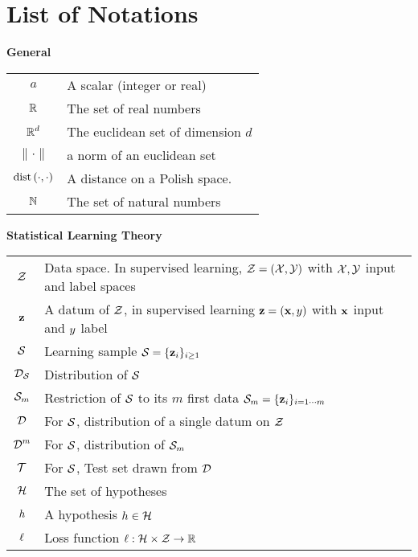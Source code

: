 \chapter*{List of Notations}
\mtcaddchapter

\def\arraystretch{1.5}

\centerline{\bf General}
\vspace{0.2cm}
\begin{tabular}{cp{13cm}}
$\displaystyle a$ & A scalar (integer or real)\\
$\displaystyle \R$ & The set of real numbers\\
$\displaystyle \R^d$ & The euclidean set of dimension $d$\\
$\|\cdot\|$ & a norm of an euclidean set \\
$\dist\LP\cdot,\cdot\RP$ & A distance on a Polish space. \\ 
$\displaystyle \N$ & The set of natural numbers\
\end{tabular}


\vspace{0.7cm}
\centerline{\bf Statistical Learning Theory}
\vspace{0.2cm}
\begin{tabular}{cp{13cm}}
$\displaystyle \Z$ & Data space. In supervised learning, $\Z=(\X,\Y)$ with $\X,\Y$ input and label spaces \\
$\displaystyle \z$ & A datum of $\Z$, in supervised learning $\z=(\x,\y)$ with $\x$ input and $\y$ label  \\
$\displaystyle \S$ & Learning sample $\S=\{\z_i\}_{i\geq 1}$\\
$\displaystyle \DS$ & Distribution of $\S$\\
$\displaystyle \Sm$ & Restriction of $\S$ to its $m$ first data $\S_m=\{\z_i\}_{i= 1\cdots m}$\\
$\displaystyle \D$ & For \iid $\S$, distribution of a single datum on $\Z$\\
$\displaystyle \D^m$ & For \iid $\S$, distribution of $\Sm$ \\
$\displaystyle \Tcal$ & For \iid $\S$, Test set drawn from $\D$\\
$\displaystyle \Hcal$ & The set of hypotheses\\
$\displaystyle \h$ & A hypothesis $\h \in \Hcal$\\
$\displaystyle \loss $ & Loss function $\loss : \Hcal\times \Z \rightarrow \Rbb $\\
\end{tabular}

